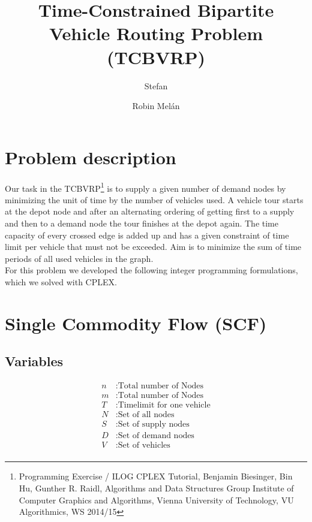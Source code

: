 \documentclass[a4paper]{article}
\begin{document}
\pagestyle{scrheadings}
\ihead{\pagemark} 

\author{Stefan  \and Robin Melán}
\title{Time-Constrained Bipartite Vehicle Routing Problem (TCBVRP)}
\maketitle
\vspace{0.5cm}

\section*{Problem description}
Our task in the TCBVRP\footnote{Programming Exercise / ILOG CPLEX Tutorial, Benjamin Biesinger, Bin Hu, Gunther R. Raidl, Algorithms and Data Structures Group Institute of Computer Graphics and Algorithms, Vienna University of Technology, VU Algorithmics, WS 2014/15} is to supply a given number of demand nodes by minimizing the unit of time by the number of vehicles used. A vehicle tour starts at the depot node and after an alternating ordering of getting first to a supply and then to a demand node the tour finishes at the depot again. The time capacity of every crossed edge is added up and has a given constraint of time limit per vehicle that must not be exceeded. Aim is to minimize the sum of time periods of all used vehicles in the graph.\\
For this problem we developed the following integer programming formulations, which we solved with CPLEX. 

\section*{Single Commodity Flow (SCF)}
\subsection*{Variables}
\begin{align*}
n &: \text{Total number of Nodes} \\
m &: \text{Total number of Nodes} \\
T &: \text{Timelimit for one vehicle} \\
N &: \text{Set of all nodes} \\
S &: \text{Set of supply nodes} \\
D &: \text{Set of demand nodes} \\
V &: \text{Set of vehicles} \\
\end{align*}
\end{document}
